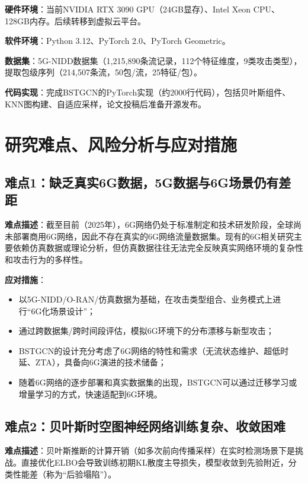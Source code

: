 \textbf{硬件环境}：当前NVIDIA RTX 3090 GPU（24GB显存）、Intel Xeon CPU、128GB内存。后续转移到虚拟云平台。

\textbf{软件环境}：Python 3.12、PyTorch 2.0、PyTorch Geometric。

\textbf{数据集}：5G-NIDD数据集（1,215,890条流记录，112个特征维度，9类攻击类型），提取包级序列（214,507条流，50包/流，25特征/包）。

\textbf{代码实现}：完成BSTGCN的PyTorch实现（约2000行代码），包括贝叶斯组件、KNN图构建、自适应采样，论文投稿后准备开源发布。

\section{研究难点、风险分析与应对措施}

\subsection{难点1：缺乏真实6G数据，5G数据与6G场景仍有差距}

\textbf{难点描述}：截至目前（2025年），6G网络仍处于标准制定和技术研发阶段，全球尚未部署商用6G网络，因此不存在真实的6G网络流量数据集。现有的6G相关研究主要依赖仿真数据或理论分析，但仿真数据往往无法完全反映真实网络环境的复杂性和攻击行为的多样性。

\textbf{应对措施}：

\begin{itemize}
  \item 以5G-NIDD/O-RAN/仿真数据为基础，在攻击类型组合、业务模式上进行``6G化场景设计''；
  \item 通过跨数据集/跨时间段评估，模拟6G环境下的分布漂移与新型攻击；
  \item BSTGCN的设计充分考虑了6G网络的特性和需求（无流状态维护、超低时延、ZTA），具备向6G演进的技术储备；
  \item 随着6G网络的逐步部署和真实数据集的出现，BSTGCN可以通过迁移学习或增量学习的方式，快速适配到6G环境。
\end{itemize}

\subsection{难点2：贝叶斯时空图神经网络训练复杂、收敛困难}

\textbf{难点描述}：贝叶斯推断的计算开销（如多次前向传播采样）在实时检测场景下是挑战。直接优化ELBO会导致训练初期KL散度主导损失，模型收敛到先验附近，分类性能差（称为``后验塌陷''）。

